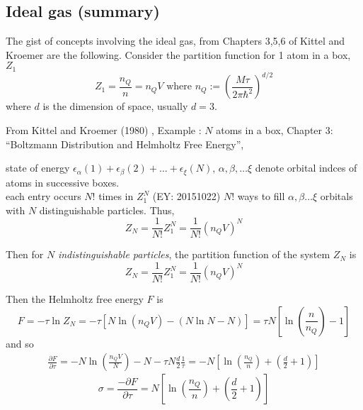 \documentclass[10pt]{amsart}
\begin{document}
\begin{multicols*}{2}


\section{Ideal gas (summary)}

The gist of concepts involving the ideal gas, from Chapters 3,5,6 of Kittel and Kroemer \cite{CKittelHKroemer1980} are the following.  Consider the partition function for 1 atom in a box, $Z_1$
\[
Z_1 = \frac{n_Q}{n} = n_Q V \text{ where } n_Q := \left( \frac{M\tau}{2\pi \hbar^2} \right)^{d/2}
\]
where $d$ is the dimension of space, usually $d=3$.  

From Kittel and Kroemer (1980) \cite{CKittelHKroemer1980}, Example : $N$ atoms in a box, Chapter 3: ``Boltzmann Distribution and Helmholtz Free Energy'', 

state of energy $\epsilon_{\alpha}(1) + \epsilon_{\beta}(2) + \dots + \epsilon_{\xi}(N)$, $\alpha, \beta, \dots \xi$ denote orbital indces of atoms in successive boxes.  \\
each entry occurs $N!$ times in $Z_1^N$ (EY: 20151022) $N!$ ways to fill $\alpha, \beta \dots \xi$ orbitals with $N$ distinguishable particles.  Thus,
\[
Z_N = \frac{1}{N!} Z_1^N = \frac{1}{N!} (n_Q V)^N
\]


Then for $N$ \emph{indistinguishable particles}, the partition function of the system $Z_N$ is 
\begin{equation}
  Z_N = \frac{1}{N!} Z_1^N = \frac{1}{N!}(n_QV)^N
\end{equation}

Then the Helmholtz free energy $F$ is 
\begin{equation}
  F = -\tau \ln{Z_N} = -\tau \left[ N \ln{ (n_Q V) } - (N\ln{N} - N) \right] = \tau N \left[ \ln{ \left( \frac{n}{n_Q} \right) - 1  }\right]
\end{equation}
and so 
\[
\begin{gathered}
  \frac{ \partial F}{ \partial \tau} = - N \ln{ \left( \frac{n_Q V}{N} \right) } - N - \tau N \frac{d}{2} \frac{1}{\tau}  = -N \left[ \ln{ \left( \frac{n_Q}{n} \right) } + \left( \frac{d}{2} + 1 \right) \right] 
\end{gathered}
\]
\begin{equation}
  \sigma = \frac{ -\partial F}{ \partial \tau} = N \left[ \ln{ \left( \frac{n_Q}{n} \right) } + \left( \frac{d}{2} + 1 \right) \right]
\end{equation}


\end{multicols*}
\end{document}
